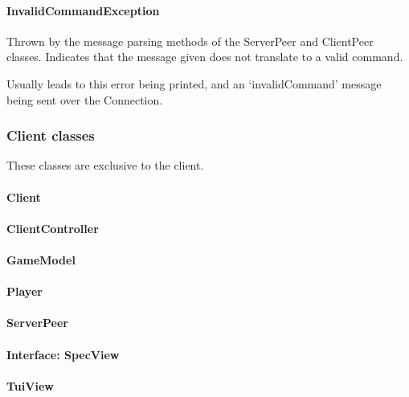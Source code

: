 \documentclass[12pt, letterpaper]{article}
\begin{document}
    \paragraph{InvalidCommandException}
    Thrown by the message parsing methods of the ServerPeer and ClientPeer classes.
    Indicates that the message given does not translate to a valid command.

    Usually leads to this error being printed, and an `invalidCommand' message being sent over the Connection.



    \subsubsection{Client classes}

    These classes are exclusive to the client.

    \paragraph{Client}

    \paragraph{ClientController}

    \paragraph{GameModel}

    \paragraph{Player}

    \paragraph{ServerPeer}

    \paragraph{Interface: SpecView}

    \paragraph{TuiView}
\end{document}
